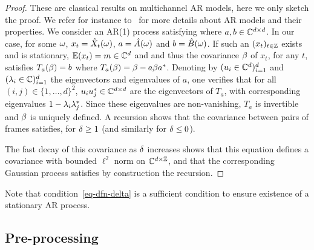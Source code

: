 \begin{proof}
	These are classical results on multichannel AR models, here we only sketch the proof.
	We refer for instance to~\cite{Ljung-Book} for more details about AR models and their properties.
	We consider an AR(1) process satisfying
	where $a, b \in \mathbb{C}^{d \times d}$. In our case, for some $\omega$, $x_t = \hat X_{t}(\omega)$, $a = \hat A(\omega)$ and $b = \hat B(\omega)$. If such an $(x_t)_{t \in \mathbb{Z}}$ exists and is stationary, $\mathbb{E}(x_t)=m \in \mathbb{C}^d$ and
	and thus the covariance $\beta$ of $x_t$, for any $t$, satisfies $T_a(\beta) = b$ where $T_a(\beta) =  \beta - a \beta a^*$. Denoting by $(u_i \in \mathbb{C}^d)_{i=1}^d$ and $(\lambda_i \in \mathbb{C})_{i=1}^d$ the eigenvectors and eigenvalues of $a$, one verifies that for all $(i,j) \in \{1,\ldots,d\}^2$, $u_i u_j^* \in \mathbb{C}^{d \times d}$ are the eigenvectors of $T_{a}$, with corresponding eigenvalues $1-\lambda_i \lambda_j^*$. Since these eigenvalues are non-vanishing, $T_a$ is invertible and $\beta$ is uniquely defined. A recursion shows that the covariance between pairs of frames satisfies, for $\delta \geq 1$
	(and similarly for $\delta \leq 0$).

	The fast decay of this covariance as $\delta$ increases shows that this equation defines a covariance with bounded $\ell^2$ norm on $\mathbb{C}^{d \times \mathbb{Z}}$, and that the corresponding Gaussian process satisfies by construction the recursion. %
\end{proof}

Note that condition~\eqref{eq-dfn-delta} is a sufficient condition to ensure existence of a stationary AR process. 

\subsection{Pre-processing}

